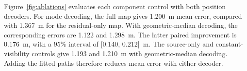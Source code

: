 Figure~\ref{fig:ablations} evaluates each component control with both position decoders. For mode decoding, the full map gives 1.200~m mean error, compared with 1.367~m for the residual-only map. With geometric-median decoding, the corresponding errors are 1.122 and 1.298~m. The latter paired improvement is 0.176~m, with a 95\% interval of [0.140, 0.212]~m. The source-only and constant-visibility controls give 1.193 and 1.210~m with geometric-median decoding. Adding the fitted paths therefore reduces mean error with either decoder.
